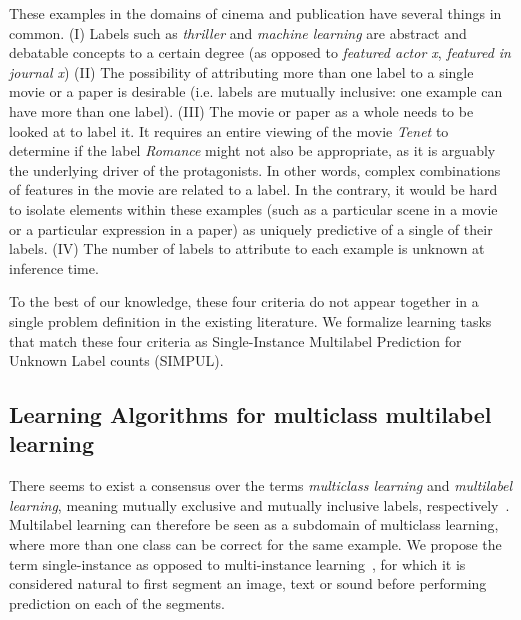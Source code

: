 
These examples in the domains of cinema and publication have several things in common. (I) Labels
such as \textit{thriller} and \textit{machine learning} are abstract and
debatable concepts to a certain degree (as opposed to \textit{featured actor
x}, \textit{featured in journal x}) (II) The possibility of attributing more
than one label to a single movie or a paper is desirable (i.e. labels are
mutually inclusive: one example can have more than one label). (III) The movie
or paper as a whole needs to be looked at to label it. It requires an entire
viewing of the movie \textit{Tenet} to determine if the label \textit{Romance}
might not also be appropriate, as it is arguably the underlying driver of the
protagonists. In other words, complex combinations of features in the movie
are related to a label. In the contrary, it would be hard to isolate elements
within these examples (such as a particular scene in a movie or a particular
expression in a paper) as uniquely predictive of a single of their labels.
(IV) The number of labels to attribute to each example is unknown at inference
time.

To the best of our knowledge, these four criteria do not appear together in a
single problem definition in the existing literature. We formalize learning
tasks that match these four criteria as Single-Instance Multilabel Prediction
for Unknown Label counts (SIMPUL).

\subsection{Learning Algorithms for multiclass multilabel learning}
There seems to exist a consensus over the terms \emph{multiclass learning} and
\emph{multilabel learning}, meaning mutually exclusive and mutually inclusive
labels, respectively~\cite{multilabelMethods}. Multilabel learning can
therefore be seen as a subdomain of multiclass learning, where more than one
class can be correct for the same example. We propose the term single-instance
as opposed to multi-instance learning~\citep[e.g.,][]{multiInstance,
multiInstanceMultiLabel}, for which it is considered natural to first segment
an image, text or sound before performing prediction on each of the segments.

